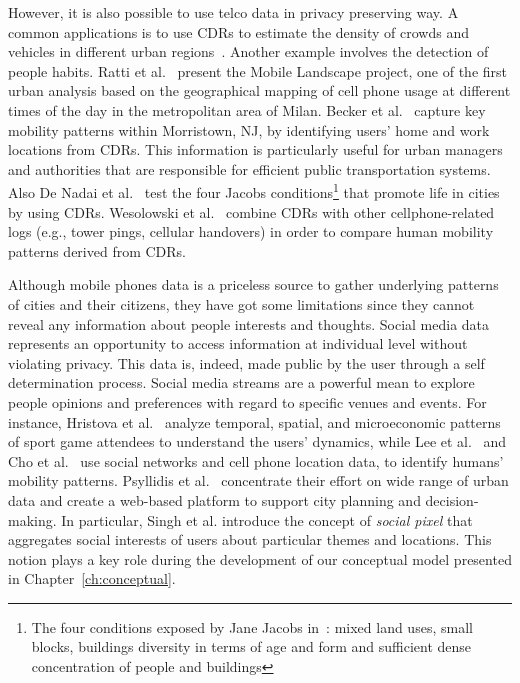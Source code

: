 However, it is also possible to use telco data in privacy preserving way.
A common applications is to use CDRs to estimate the density of crowds and vehicles in different urban regions~\cite{mcardleanalyzing,caceres2012exploring}. Another example involves the detection of people habits. Ratti et al.~\cite{ratti2006mobile} present the Mobile Landscape project, one of the first urban analysis based on the geographical mapping of cell phone usage at different times of the day in the metropolitan area of Milan. Becker et al.~\cite{becker2011tale} capture key mobility patterns within Morristown, NJ, by identifying users' home and work locations from CDRs. This information is particularly useful for urban managers and authorities that are responsible for efficient public transportation systems. Also De Nadai et al.~\cite{de2016death} test the four Jacobs conditions\footnote{The four conditions exposed by Jane Jacobs in~\cite{jacobs1961death}: mixed land uses, small blocks, buildings diversity in terms of age and form and sufficient dense concentration of people and buildings} that promote life in cities by using CDRs. Wesolowski et al.~\cite{wesolowski2013impact} combine CDRs with other cellphone-related logs (e.g., tower pings, cellular handovers) in order to compare human mobility patterns derived from CDRs.

Although mobile phones data is a priceless source to gather underlying patterns of cities and their citizens, they have got some limitations since they cannot reveal any information about people interests and thoughts. Social media data represents an opportunity to access information at individual level without violating privacy. This data is, indeed, made public by the user through a self determination process.
Social media streams are a powerful mean to explore people opinions and preferences with regard to specific venues and events.
For instance, Hristova et al.~\cite{hristova2016if} analyze temporal, spatial, and microeconomic patterns of sport game attendees to understand the users' dynamics, while Lee et al.~\cite{lee2016not} and Cho et al.~\cite{cho2011friendship} use social networks and cell phone location data, to identify humans' mobility patterns. Psyllidis et al.~\cite{psyllidis2015platform} concentrate their effort on wide range of urban data and create a web-based platform to support city planning and decision-making. In particular, Singh et al. \cite{singh2010social} introduce the concept of \textit{social pixel} that aggregates social interests of users about particular themes and locations. 
This notion plays a key role during the development of our conceptual model presented in Chapter~\ref{ch:conceptual}.

